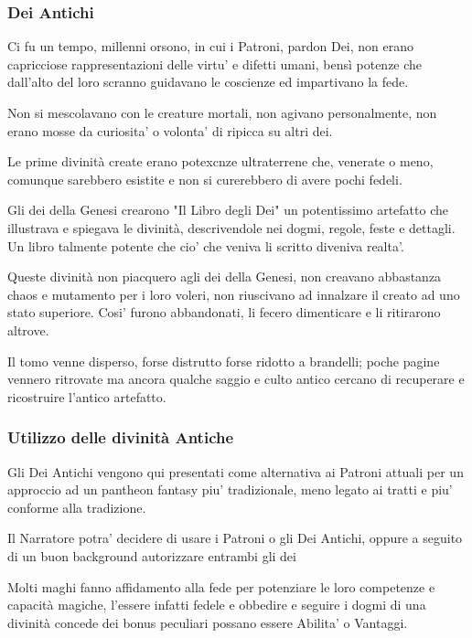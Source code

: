 \documentclass[a4paper,11pt,twoside,openany]{book}
\begin{document}
\pagebreak

\subsubsection*{Dei Antichi}

Ci fu un tempo, millenni orsono, in cui i Patroni, pardon Dei, non erano capricciose rappresentazioni delle virtu' e difetti umani, bensì potenze che dall'alto del loro scranno guidavano le coscienze ed impartivano la fede.

Non si mescolavano con le creature mortali, non agivano personalmente, non erano mosse da curiosita' o volonta' di ripicca su altri dei.

Le prime divinità create erano potexcnze ultraterrene che, venerate o meno, comunque sarebbero esistite e non si curerebbero di avere pochi fedeli.

Gli dei della Genesi crearono "Il Libro degli Dei" un potentissimo artefatto che illustrava e spiegava le divinità, descrivendole nei dogmi, regole, feste e dettagli.
Un libro talmente potente che cio' che veniva li scritto diveniva realta'.

Queste divinità non piacquero agli dei della Genesi, non creavano abbastanza chaos e mutamento per i loro voleri, non riuscivano ad innalzare il creato ad uno stato superiore.
Cosi' furono abbandonati, li fecero dimenticare e li ritirarono altrove.

Il tomo venne disperso, forse distrutto forse ridotto a brandelli; poche pagine vennero ritrovate ma ancora qualche saggio e culto antico cercano di recuperare e ricostruire l'antico artefatto.

\subsubsection{Utilizzo delle divinità Antiche}

Gli Dei Antichi vengono qui presentati come alternativa ai Patroni attuali per un approccio ad un pantheon  fantasy piu' tradizionale, meno legato ai tratti e piu' conforme alla tradizione.

Il Narratore potra' decidere di usare i Patroni o gli Dei Antichi, oppure a seguito di un buon background autorizzare entrambi gli dei

Molti maghi fanno affidamento alla fede per potenziare le loro competenze e capacità magiche, l'essere infatti fedele e obbedire e seguire i dogmi di una divinità concede dei bonus peculiari possano essere Abilita' o Vantaggi.
\end{document}
